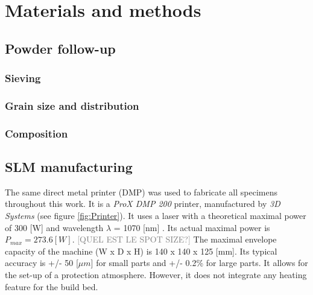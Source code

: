 \chapter{Materials and methods}
\label{Chap3}
\section{Powder follow-up}

\subsection{Sieving}

\subsection{Grain size and distribution}

\subsection{Composition}


\section{SLM manufacturing}
\label{MMFPP}
The same direct metal printer (DMP) was used to fabricate all specimens throughout this work. It is a \textit{ProX DMP 200} printer, manufactured by \textit{3D Systems} (see figure \ref{fig:Printer}). It uses a laser with a theoretical maximal power of 300 [W] and wavelength $\lambda$ = 1070 [nm] \parencite{3D}. Its actual maximal power is $P_{max}=273.6 [W]$. \textcolor{gray}{[QUEL EST LE SPOT SIZE?]}  The maximal envelope capacity of the machine (W x D x H) is 140 x 140 x 125 [mm]. Its typical accuracy is +/- 50 [$\mu m$] for small parts and +/- 0.2\% for large parts. It allows for the set-up of a protection atmosphere. However, it does not integrate any heating feature for the build bed.\\

